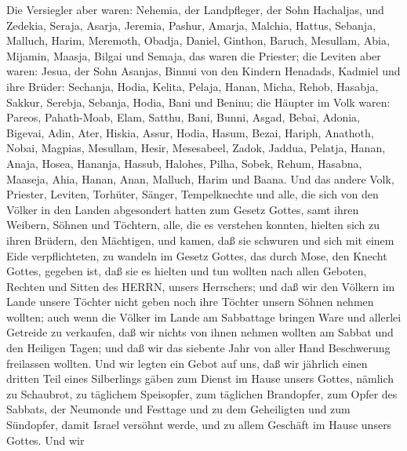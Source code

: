  Die Versiegler aber waren: Nehemia, der Landpfleger, der
Sohn Hachaljas, und Zedekia,  Seraja, Asarja, Jeremia,
 Pashur, Amarja, Malchia,  Hattus, Sebanja,
Malluch,  Harim, Meremoth, Obadja,  Daniel,
Ginthon, Baruch,  Mesullam, Abia, Mijamin, 
Maasja, Bilgai und Semaja, das waren die Priester;  die
Leviten aber waren: Jesua, der Sohn Asanjas, Binnui von den Kindern
Henadads, Kadmiel  und ihre Brüder: Sechanja, Hodia,
Kelita, Pelaja, Hanan,  Micha, Rehob, Hasabja,
 Sakkur, Serebja, Sebanja,  Hodia, Bani und
Beninu;  die Häupter im Volk waren: Pareos, Pahath-Moab,
Elam, Satthu, Bani,  Bunni, Asgad, Bebai, 
Adonia, Bigevai, Adin,  Ater, Hiskia, Assur, 
Hodia, Hasum, Bezai,  Hariph, Anathoth, Nobai,
 Magpias, Mesullam, Hesir,  Mesesabeel, Zadok,
Jaddua,  Pelatja, Hanan, Anaja,  Hosea,
Hananja, Hassub,  Halohes, Pilha, Sobek, 
Rehum, Hasabna, Maaseja,  Ahia, Hanan, Anan, 
Malluch, Harim und Baana.  Und das andere Volk, Priester,
Leviten, Torhüter, Sänger, Tempelknechte und alle, die sich von den
Völker in den Landen abgesondert hatten zum Gesetz Gottes, samt ihren
Weibern, Söhnen und Töchtern, alle, die es verstehen konnten,
 hielten sich zu ihren Brüdern, den Mächtigen, und kamen,
daß sie schwuren und sich mit einem Eide verpflichteten, zu wandeln im
Gesetz Gottes, das durch Mose, den Knecht Gottes, gegeben ist, daß sie
es hielten und tun wollten nach allen Geboten, Rechten und Sitten des
HERRN, unsers Herrschers;  und daß wir den Völkern im Lande
unsere Töchter nicht geben noch ihre Töchter unsern Söhnen nehmen
wollten;  auch wenn die Völker im Lande am Sabbattage
bringen Ware und allerlei Getreide zu verkaufen, daß wir nichts von
ihnen nehmen wollten am Sabbat und den Heiligen Tagen; und daß wir das
siebente Jahr von aller Hand Beschwerung freilassen wollten.
 Und wir legten ein Gebot auf uns, daß wir jährlich einen
dritten Teil eines Silberlings gäben zum Dienst im Hause unsers Gottes,
 nämlich zu Schaubrot, zu täglichem Speisopfer, zum
täglichen Brandopfer, zum Opfer des Sabbats, der Neumonde und Festtage
und zu dem Geheiligten und zum Sündopfer, damit Israel versöhnt werde,
und zu allem Geschäft im Hause unsers Gottes.  Und wir

